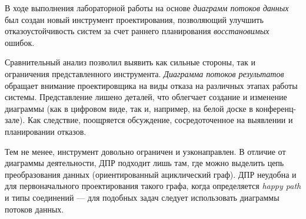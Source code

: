 \documentclass[listings]{labreport}
\begin{document}
В ходе выполнения лабораторной работы на основе \textit{диаграмм потоков данных}
был создан новый инструмент проектирования, позволяющий улучшить отказоустойчивость
систем за счет раннего планирования \textit{восстановимых} ошибок.

Сравнительный анализ позволил выявить как сильные стороны, так и ограничения
представленного инструмента. \textit{Диаграмма потоков результатов} обращает
внимание проектировщика на виды отказа на различных этапах работы системы.
Представление лишено деталей, что облегчает создание и изменение диаграммы
(как в цифровом виде, так и, например, на белой доске в конференц-зале).
Как следствие, поощряется обсуждение, сосредоточенное на выявлении и планировании
отказов.

Тем не менее, инструмент довольно ограничен и узконаправлен. В отличие от диаграммы деятельности,
ДПР подходит лишь там, где можно выделить цепь преобразования данных
(ориентированный ациклический граф). ДПР неудобна и для первоначального проектирования
такого графа, когда определяется \textit{happy path} и типы соединений — для
подобных задач следует использовать диаграммы потоков данных.
\end{document}
